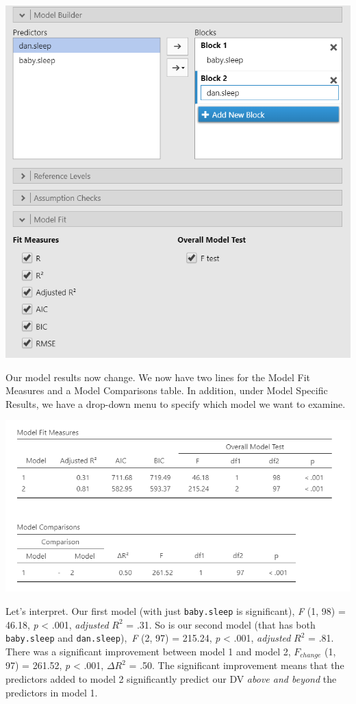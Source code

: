\documentclass[
]{book}
\begin{document}
\includegraphics{images/13-regression/hierarchical-setup.png}

Our model results now change. We now have two lines for the Model Fit Measures and a Model Comparisons table. In addition, under Model Specific Results, we have a drop-down menu to specify which model we want to examine.

\includegraphics{images/13-regression/hierarchical-results.png}

Let's interpret. Our first model (with just \texttt{baby.sleep} is significant), \emph{F} (1, 98) = 46.18, \emph{p} \textless{} .001, \emph{adjusted} \(R^2\) = .31. So is our second model (that has both \texttt{baby.sleep} and \texttt{dan.sleep}),~\emph{F} (2, 97) = 215.24, \emph{p} \textless{} .001, \emph{adjusted} \(R^2\) = .81. There was a significant improvement between model 1 and model 2, \(F_{change}\) (1, 97) = 261.52, \emph{p} \textless{} .001, \(\Delta R^2\) = .50. The significant improvement means that the predictors added to model 2 significantly predict our DV \emph{above and beyond} the predictors in model 1.
\end{document}
